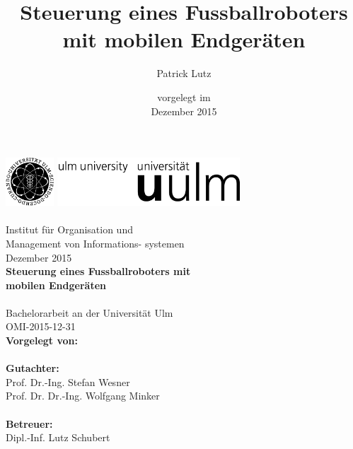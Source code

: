 \documentclass[BCOR20mm,DIV14,twoside,10pt,headinclude,footexclude,bibtotoc,liststotoc]{scrbook}
\title{Steuerung eines Fussballroboters mit mobilen Endgeräten} \let\thetitle\@title
\author{Patrick Lutz} \let\theauthor\@author
\date{
\footnotesize vorgelegt im\\
\normalsize Dezember 2015
}
\begin{document}
\frontmatter %
\thispagestyle{empty}

\newlength{\backup}
\setlength{\backup}{\headheight}

\includegraphics[height=1.8cm]{images/logo_100_sw_bildmarke}
\hfill
\includegraphics[height=1.8cm]{images/logo_100_sw_wortmarke}\\[1em]

{\footnotesize
{}\\
\hspace*{10.85cm}Institut für Organisation und\\
\hspace*{10.85cm}Management von Informations-
\hspace*{10.85cm}systemen\\[1em]
\hspace*{10.85cm}Dezember 2015\\[6em]
}
{\bfseries \huge Steuerung eines Fussballroboters mit \\ mobilen Endgeräten\\
}\\[0.5em]
{\large Bachelorarbeit an der Universität Ulm}\\[1em]
OMI-2015-12-31\\[4em]


{\large \bfseries Vorgelegt von:}\\                     
\theauthor \\[2em]
{\large \bfseries Gutachter:}\\                     
Prof. Dr.-Ing. Stefan Wesner\\
Prof. Dr. Dr.-Ing. Wolfgang Minker\\
\\[2em]
{\large \bfseries Betreuer:}\\ 
Dipl.-Inf. Lutz Schubert\\
\end{document}
